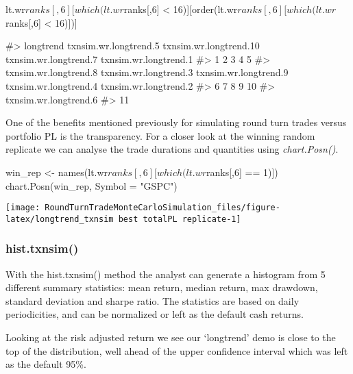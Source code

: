 \begin{Schunk}
\begin{Sinput}
lt.wr$ranks[,6][which(lt.wr$ranks[,6] < 16)][order(lt.wr$ranks[,6][which(lt.wr$ranks[,6] < 16)])]
\end{Sinput}
\begin{Soutput}
#>              longtrend  txnsim.wr.longtrend.5 txnsim.wr.longtrend.10  txnsim.wr.longtrend.7  txnsim.wr.longtrend.1 
#>                      1                      2                      3                      4                      5 
#>  txnsim.wr.longtrend.8  txnsim.wr.longtrend.3  txnsim.wr.longtrend.9  txnsim.wr.longtrend.4  txnsim.wr.longtrend.2 
#>                      6                      7                      8                      9                     10 
#>  txnsim.wr.longtrend.6 
#>                     11
\end{Soutput}
\end{Schunk}

One of the benefits mentioned previously for simulating round turn
trades versus portfolio PL is the transparency. For a closer look at the
winning random replicate we can analyse the trade durations and
quantities using \emph{chart.Posn()}.

\begin{Schunk}
\begin{Sinput}
win_rep <- names(lt.wr$ranks[,6][which(lt.wr$ranks[,6] == 1)])
chart.Posn(win_rep, Symbol = "GSPC")
\end{Sinput}


\begin{center}\texttt{[image: RoundTurnTradeMonteCarloSimulation\_files/figure-latex/longtrend\_txnsim best totalPL replicate-1]} \end{center}

\end{Schunk}

\hypertarget{hist.txnsim}{%
\subsubsection{hist.txnsim()}\label{hist.txnsim}}

With the hist.txnsim() method the analyst can generate a histogram from
5 different summary statistics: mean return, median return, max
drawdown, standard deviation and sharpe ratio. The statistics are based
on daily periodicities, and can be normalized or left as the default
cash returns.

Looking at the risk adjusted return we see our `longtrend' demo is close
to the top of the distribution, well ahead of the upper confidence
interval which was left as the default 95\%.

